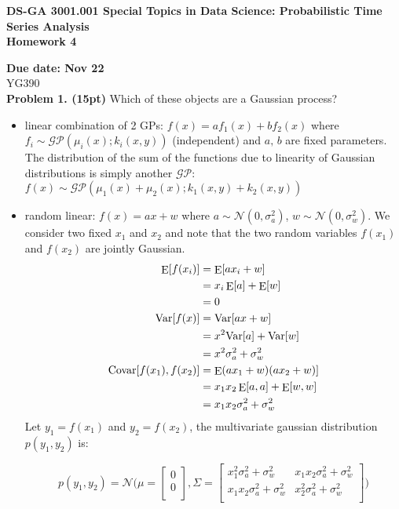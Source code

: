 \documentclass[12pt]{article}
\DeclareMathOperator*{\E}{\rm E}
\newcommand{\Var}{\mathrm{Var}}
\newcommand{\Covar}{\mathrm{Covar}}
\begin{document}
\thispagestyle{empty}
\begin{center}

\textbf{DS-GA 3001.001 Special Topics in Data Science: Probabilistic Time Series Analysis\\
Homework 4}
\end{center}

\noindent \textbf{Due date: Nov  22}\\
\noindent YG390\\


\noindent \textbf{Problem 1. (15pt)} Which of these objects are a Gaussian process?
\begin{itemize}
\item linear combination of 2 GPs: $f(x) = a f_1(x) + b f_2(x)$ where $f_i \sim \mathcal{GP}(\mu_i(x); k_i(x,y))$ (independent) and $a,\, b$ are fixed parameters.
The distribution of the sum of the functions due to linearity of Gaussian distributions is simply another $\mathcal{GP}$: $ f(x) \sim  \mathcal{GP}(\mu_1(x) + \mu_2(x); k_1(x,y) + k_2(x,y))$

\item random linear: $ f(x) = a x + w$ where $a \sim \mathcal{N}(0,\sigma_a^2)$, $w\sim \mathcal{N}(0,\sigma_w^2)$.
We consider two fixed $x_1$ and $x_2$ and note that the two random variables $f(x_1)$ and $f(x_2)$ are jointly Gaussian.
\begin{align*}
	\E[f(x_i)]			&=	\E[a x_i + w] \\
					&= 	x_i \E[a] + \E[w] \\
					&=	0 \\
	\Var[f(x)]			&=	\Var[ a x + w] \\
					&= 	x^2 \Var[a] + \Var[w] \\
					&=	x^2 \sigma_a^2 + \sigma_w^2 \\
	\Covar[f(x_1),f(x_2)]	&=	\E (a x_1 + w)(a x_2 + w)] \\
					&=	x_1 x_2 \E[a,a] + \E[w,w]  \\
					&=	x_1 x_2 \sigma_a^2 + \sigma_w^2			
\end{align*}
Let $y_1=f(x_1)$ and $y_2=f(x_2)$, the multivariate gaussian distribution $p(y_1,y_2)$ is:

\[
p(y_1,y_2) = 
	\mathcal{N} \Big(
	\mu = \begin{bmatrix}
		0 \\
		0 \\
	\end{bmatrix}
	,
	\Sigma = \begin{bmatrix}
		x_1^2 \sigma_a^2 + \sigma_w^2 & x_1 x_2 \sigma_a^2 + \sigma_w^2	 \\
		x_1 x_2 \sigma_a^2 + \sigma_w^2	&  x_2^2 \sigma_a^2 + \sigma_w^2 \\
	\end{bmatrix}
	\Big)
\]	


\end{itemize}
\end{document}
